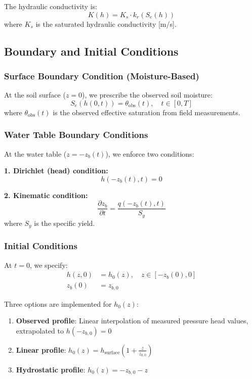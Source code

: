 \documentclass[11pt,a4paper]{article}
\begin{document}
The hydraulic conductivity is:
\begin{equation}
    K(h) = K_s \cdot k_r(S_e(h))
    \label{eq:K_h}
\end{equation}
where $K_s$ is the saturated hydraulic conductivity [m/s].

\subsection{Boundary and Initial Conditions}

\subsubsection{Surface Boundary Condition (Moisture-Based)}
At the soil surface ($z = 0$), we prescribe the observed soil moisture:
\begin{equation}
    S_e(h(0,t)) = \theta_{\text{obs}}(t), \quad t \in [0, T]
    \label{eq:bc_surface_moisture}
\end{equation}
where $\theta_{\text{obs}}(t)$ is the observed effective saturation from field measurements.

\subsubsection{Water Table Boundary Conditions}
At the water table ($z = -z_b(t)$), we enforce two conditions:

\textbf{1. Dirichlet (head) condition:}
\begin{equation}
    h(-z_b(t), t) = 0
    \label{eq:bc_wt_head}
\end{equation}

\textbf{2. Kinematic condition:}
\begin{equation}
    \frac{\partial z_b}{\partial t} = \frac{q(-z_b(t), t)}{S_y}
    \label{eq:bc_wt_kinematic}
\end{equation}
where $S_y$ is the specific yield.

\subsubsection{Initial Conditions}
At $t = 0$, we specify:
\begin{align}
    h(z, 0) &= h_0(z), \quad z \in [-z_b(0), 0] \label{eq:ic_h} \\
    z_b(0) &= z_{b,0} \label{eq:ic_zb}
\end{align}

Three options are implemented for $h_0(z)$:
\begin{enumerate}
    \item \textbf{Observed profile}: Linear interpolation of measured pressure head values, extrapolated to $h(-z_{b,0}) = 0$
    \item \textbf{Linear profile}: $h_0(z) = h_{\text{surface}} \left(1 + \frac{z}{z_{b,0}}\right)$
    \item \textbf{Hydrostatic profile}: $h_0(z) = -z_{b,0} - z$
\end{enumerate}
\end{document}
